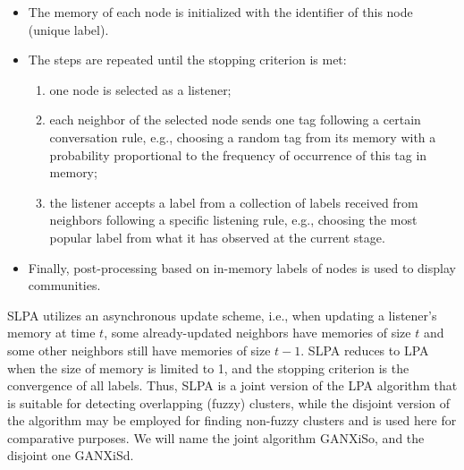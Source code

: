 \begin{itemize}
	\item The memory of each node is initialized with the identifier of this node (unique label).
	\item The steps are repeated until the stopping criterion is met:
	\begin{enumerate}
		\item one node is selected as a listener;
		\item each neighbor of the selected node sends one tag following a certain conversation rule, e.g., choosing a random tag from its memory with a probability proportional to the frequency of occurrence of this tag in memory;
		\item the listener accepts a label from a collection of labels received from neighbors following a specific listening rule, e.g., choosing the most popular label from what it has observed at the current stage.
	\end{enumerate}
	\item Finally, post-processing based on in-memory labels of nodes is used to display communities.
\end{itemize}

SLPA utilizes an asynchronous update scheme, i.e., when updating a listener’s memory at time \(t\), some already-updated neighbors have memories of size \(t\) and some other neighbors still have memories of size \(t - 1\). SLPA reduces to LPA when the size of memory is limited to 1, and the stopping criterion is the convergence of all labels. Thus, SLPA is a joint version of the LPA algorithm that is suitable for detecting overlapping (fuzzy) clusters, while the disjoint version of the algorithm may be employed for finding non-fuzzy clusters and is used here for comparative purposes. We will name the joint algorithm GANXiSo, and the disjoint one GANXiSd.

